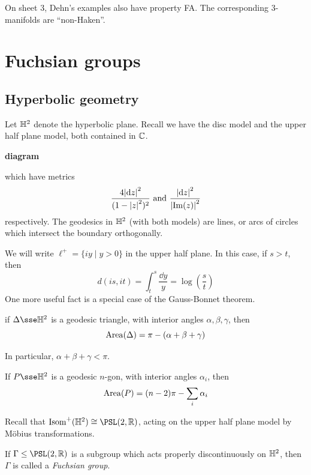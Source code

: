 \documentclass{article}
\begin{document}
On sheet 3, Dehn's examples also have property FA. The corresponding \(3\)-manifolds are ``non-Haken''.

\section{Fuchsian groups}

\subsection{Hyperbolic geometry}

Let \(\mathbb{H}^2\) denote the hyperbolic plane. Recall we have the disc model and the upper half plane model, both contained in \(\mathbb{C}\).

\textbf{diagram}

which have metrics
\[\frac{4\abs{\dd z}^2}{(1 - \abs{z}^2)^2} \text{ and } \frac{\abs{\dd z}^2}{\abs{\Im(z)}^2}\]
respectively. The geodesics in \(\mathbb{H}^2\) (with both models) are lines, or arcs of circles which intersect the boundary orthogonally.

We will write \(\ell^+ = \{iy \mid y > 0\}\) in the upper half plane. In this case, if \(s > t\), then
\[d(is, it) = \int_t^s \frac{\dd y}{y} = \log(\frac{s}{t})\]
One more useful fact is a special case of the Gauss-Bonnet theorem.

\begin{proposition}
     if \(\Delta \sse \bb H^2\) is a geodesic triangle, with interior angles \(\alpha, \beta, \gamma\), then
    \[\operatorname{Area}(\Delta) = \pi - (\alpha + \beta + \gamma)\] 
\end{proposition}

In particular, \(\alpha + \beta + \gamma < \pi\).

\begin{corollary}
    If \(P \sse \bb H^2\) is a geodesic \(n\)-gon, with interior angles \(\alpha_i\), then
    \[\operatorname{Area}(P) = (n-2)\pi - \sum_i \alpha_i\]
\end{corollary}

Recall that \(\Isom^+(\bb H^2) \cong \PSL(2, \R)\), acting on the upper half plane model by M\"obius transformations.

\begin{definition}
    If \(\Gamma \le \PSL(2, \R)\) is a subgroup which acts properly discontinuously on \(\mathbb{H}^2\), then \(\Gamma\) is called a \emph{Fuchsian group}.
\end{definition}
\end{document}
